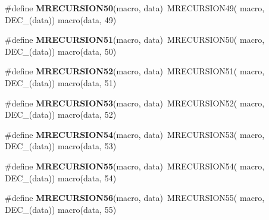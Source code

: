 \begin{DoxyCompactItemize}
\item 
\hypertarget{group__group__sam0__utils__mrecursion_gadda406cbee1fde1ebddb8671c858981c}{}\#define {\bfseries M\+R\+E\+C\+U\+R\+S\+I\+O\+N50}(macro,  data)~M\+R\+E\+C\+U\+R\+S\+I\+O\+N49(  macro, D\+E\+C\+\_\+(data))   macro(data, 49)\label{group__group__sam0__utils__mrecursion_gadda406cbee1fde1ebddb8671c858981c}

\item 
\hypertarget{group__group__sam0__utils__mrecursion_ga6e7ba2940484a6723ca0f5a6c844ba89}{}\#define {\bfseries M\+R\+E\+C\+U\+R\+S\+I\+O\+N51}(macro,  data)~M\+R\+E\+C\+U\+R\+S\+I\+O\+N50(  macro, D\+E\+C\+\_\+(data))   macro(data, 50)\label{group__group__sam0__utils__mrecursion_ga6e7ba2940484a6723ca0f5a6c844ba89}

\item 
\hypertarget{group__group__sam0__utils__mrecursion_ga168834cb335f274f04d497f16f7b3289}{}\#define {\bfseries M\+R\+E\+C\+U\+R\+S\+I\+O\+N52}(macro,  data)~M\+R\+E\+C\+U\+R\+S\+I\+O\+N51(  macro, D\+E\+C\+\_\+(data))   macro(data, 51)\label{group__group__sam0__utils__mrecursion_ga168834cb335f274f04d497f16f7b3289}

\item 
\hypertarget{group__group__sam0__utils__mrecursion_ga3ae2341c96ce8ddf34769207f469c5e6}{}\#define {\bfseries M\+R\+E\+C\+U\+R\+S\+I\+O\+N53}(macro,  data)~M\+R\+E\+C\+U\+R\+S\+I\+O\+N52(  macro, D\+E\+C\+\_\+(data))   macro(data, 52)\label{group__group__sam0__utils__mrecursion_ga3ae2341c96ce8ddf34769207f469c5e6}

\item 
\hypertarget{group__group__sam0__utils__mrecursion_ga1b859acc9e5724f34b432b236b8fd422}{}\#define {\bfseries M\+R\+E\+C\+U\+R\+S\+I\+O\+N54}(macro,  data)~M\+R\+E\+C\+U\+R\+S\+I\+O\+N53(  macro, D\+E\+C\+\_\+(data))   macro(data, 53)\label{group__group__sam0__utils__mrecursion_ga1b859acc9e5724f34b432b236b8fd422}

\item 
\hypertarget{group__group__sam0__utils__mrecursion_ga9ebaa5b7ac45c089517951e6978ee88a}{}\#define {\bfseries M\+R\+E\+C\+U\+R\+S\+I\+O\+N55}(macro,  data)~M\+R\+E\+C\+U\+R\+S\+I\+O\+N54(  macro, D\+E\+C\+\_\+(data))   macro(data, 54)\label{group__group__sam0__utils__mrecursion_ga9ebaa5b7ac45c089517951e6978ee88a}

\item 
\hypertarget{group__group__sam0__utils__mrecursion_ga1899efaf30176f2ad8b7b1e22b2564c5}{}\#define {\bfseries M\+R\+E\+C\+U\+R\+S\+I\+O\+N56}(macro,  data)~M\+R\+E\+C\+U\+R\+S\+I\+O\+N55(  macro, D\+E\+C\+\_\+(data))   macro(data, 55)\label{group__group__sam0__utils__mrecursion_ga1899efaf30176f2ad8b7b1e22b2564c5}


\end{DoxyCompactItemize}
